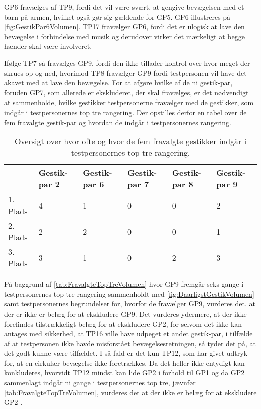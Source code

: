 GP6 fravælges af TP9, fordi det vil være svært, at gengive bevægelsen med et barn på armen, hvilket også gør sig gældende for GP5. GP6 illustreres på \autoref{fig:GestikPar6Volumen}. TP17 fravælger GP6, fordi det er ulogisk at lave den bevægelse i forbindelse med musik og derudover virker det mærkeligt at begge hænder skal være involveret. 

Ifølge TP7 så fravælges GP9, fordi den ikke tillader kontrol over hvor meget der skrues op og ned, hvorimod TP8 fravælger GP9 fordi testpersonen vil have det akavet med at lave den bevægelse.\blankline
%
For at afgøre hvilke af de ni gestik-par, foruden GP7, som allerede er ekskluderet, der skal fravælges, er det nødvendigt at sammenholde, hvilke gestikker testpersonerne fravælger med de gestikker, som indgår i testpersonernes top tre rangering. Der opstilles derfor en tabel over de fem fravalgte gestik-par og hvordan de indgår i testpersonernes rangering.    
%
\begin{table}[H]
	\centering
	\begin{tabular}{ | p{1.5cm} | p{2.1cm} | p{2.1cm} | p{2.1cm} | p{2.1cm} | p{2.1cm} |}
	\hline
		 & Gestik-par 2 & Gestik-par 6 & Gestik-par 7 & Gestik-par 8 & Gestik-par 9 \\ \hline
		1. Plads & 4 & 1 & 0 & 0 & 2\\ \hline
		2. Plads & 2 & 2 & 0 & 0 & 1\\ \hline
		3. Plads & 3 & 1 & 0 & 2 & 3\\ \hline
	\end{tabular}
	\caption{Oversigt over hvor ofte og hvor de fem fravalgte gestikker indgår i testpersonernes top tre rangering.}
	\label{tab:FravalgteTopTreVolumen}
\end{table}
\noindent
%
På baggrund af \autoref{tab:FravalgteTopTreVolumen} hvor GP9 fremgår seks gange i testpersonernes top tre rangering sammenholdt med \autoref{fig:DaarligstGestikVolumen} samt testpersonernes begrundelser for, hvorfor de fravælger GP9, vurderes det, at der er ikke er belæg for at ekskludere GP9. Det vurderes ydermere, at der ikke forefindes tilstrækkeligt belæg for at ekskludere GP2, for selvom det ikke kan antages med sikkerhed, at TP16 ville have udpeget et andet gestik-par, i tilfælde af at testpersonen ikke havde misforstået bevægelsesretningen, så tyder det på, at det godt kunne være tilfældet. I så fald er det kun TP12, som har givet udtryk for, at en cirkulær bevægelse ikke foretrækkes. Da det heller ikke entydigt kan konkluderes, hvorvidt TP12 mindst kan lide GP2 i forhold til GP1 og da GP2 sammenlagt indgår ni gange i testpersonernes top tre, jævnfør \autoref{tab:FravalgteTopTreVolumen}, vurderes det at der ikke er belæg for at ekskludere GP2 .
